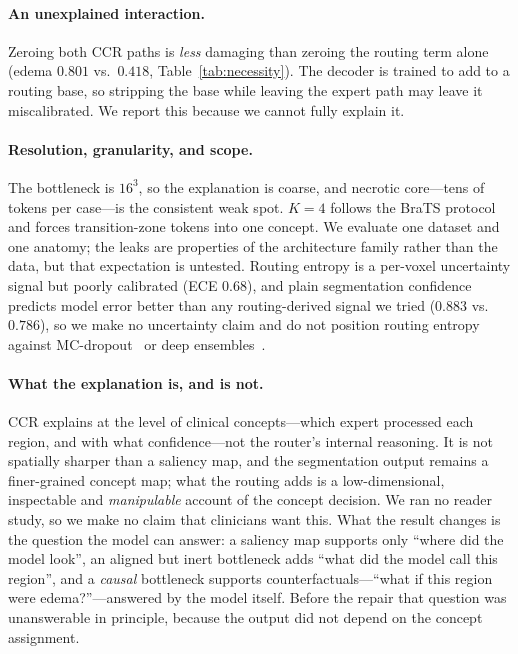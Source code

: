 \paragraph{An unexplained interaction.}
Zeroing both CCR paths is \emph{less} damaging than zeroing the routing term alone (edema $0.801$
vs.\ $0.418$, Table~\ref{tab:necessity}). The decoder is trained to add to a routing base, so
stripping the base while leaving the expert path may leave it miscalibrated. We report this
because we cannot fully explain it.

\paragraph{Resolution, granularity, and scope.}
The bottleneck is $16^3$, so the explanation is coarse, and necrotic core---tens of tokens per
case---is the consistent weak spot. $K{=}4$ follows the BraTS protocol and forces transition-zone
tokens into one concept. We evaluate one dataset and one anatomy; the leaks are properties of the
architecture family rather than the data, but that expectation is untested. Routing entropy is a per-voxel uncertainty signal but poorly calibrated (ECE $0.68$), and
plain segmentation confidence predicts model error better than any routing-derived signal we tried
($0.883$ vs.\ $0.786$), so we make no uncertainty claim and do not position routing entropy
against MC-dropout~\cite{gal2016dropout} or deep ensembles~\cite{lakshminarayanan2017ensembles}.

\paragraph{What the explanation is, and is not.}
CCR explains at the level of clinical concepts---which expert processed each region, and with what
confidence---not the router's internal reasoning. It is not spatially sharper than a saliency map,
and the segmentation output remains a finer-grained concept map; what the routing adds is a
low-dimensional, inspectable and \emph{manipulable} account of the concept decision. We ran no
reader study, so we make no claim that clinicians want this. What the result changes is the
question the model can answer: a saliency map supports only ``where did the model look'', an
aligned but inert bottleneck adds ``what did the model call this region'', and a \emph{causal}
bottleneck supports counterfactuals---``what if this region were edema?''---answered by the model
itself. Before the repair that question was unanswerable in principle, because the output did not
depend on the concept assignment.

